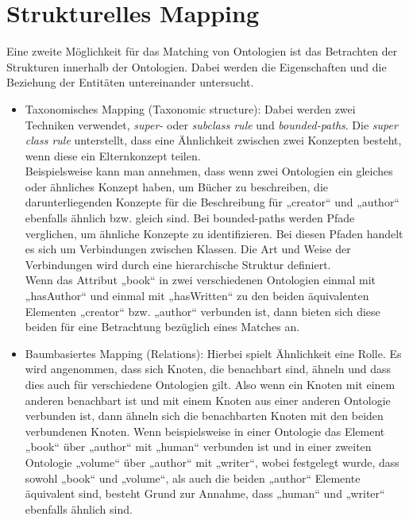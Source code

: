 	\section{Strukturelles Mapping}
	\label{StrukturellesMapping}
	Eine zweite Möglichkeit für das Matching von Ontologien ist das Betrachten der
	Strukturen innerhalb der Ontologien. Dabei werden die Eigenschaften und die
	Beziehung der Entitäten untereinander untersucht.
	\begin{itemize}
		\item Taxonomisches Mapping (Taxonomic structure): Dabei werden zwei Techniken
		verwendet, \textit{super-} oder  \textit{subclass rule} und
		\textit{bounded-paths}. Die \textit{super class rule} unterstellt, dass eine
		Ähnlichkeit zwischen zwei Konzepten besteht, wenn diese ein Elternkonzept
		teilen. \cite{EuzShv07}\\
		Beispielsweise kann man annehmen, dass wenn zwei
		Ontologien ein gleiches oder ähnliches Konzept haben, um Bücher zu
		beschreiben, die darunterliegenden Konzepte für die Beschreibung für
		„creator“ und „author“ ebenfalls ähnlich bzw. gleich sind. Bei bounded-paths
		werden Pfade verglichen, um ähnliche Konzepte zu identifizieren. Bei diesen
		Pfaden handelt es sich um Verbindungen zwischen Klassen. Die Art und Weise der
		Verbindungen wird durch eine hierarchische Struktur definiert.
		\cite{EuzShv07}\\
		Wenn das Attribut „book“ in zwei verschiedenen Ontologien
		einmal mit „hasAuthor“ und einmal mit „hasWritten“ zu den beiden äquivalenten
		Elementen „creator“ bzw. „author“ verbunden ist, dann bieten sich diese beiden
		für eine Betrachtung bezüglich eines Matches an.
		\item Baumbasiertes Mapping (Relations): Hierbei spielt Ähnlichkeit eine
		Rolle.
		Es wird angenommen, dass sich Knoten, die benachbart sind, ähneln und dass
		dies auch für verschiedene Ontologien gilt. Also wenn ein Knoten mit einem anderen
		benachbart ist und mit einem Knoten aus einer anderen Ontologie verbunden ist,
		dann ähneln sich die benachbarten Knoten mit den beiden verbundenen Knoten.
		Wenn beispielsweise in einer Ontologie das Element „book“ über „author“ mit „human“
		verbunden ist und in einer zweiten Ontologie „volume“ über „author“ mit
		„writer“, wobei festgelegt wurde, dass sowohl „book“ und „volume“, als auch
		die beiden „author“ Elemente äquivalent sind, besteht Grund zur Annahme, dass
		„human“ und „writer“ ebenfalls ähnlich sind.\cite{EuzShv07}
	\end{itemize}
	
